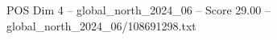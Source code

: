 \begin{textsample}{POS Dim 4 – global\_north\_2024\_06 – Score 29.00 – global\_north\_2024\_06/108691298.txt}
\end{textsample}
